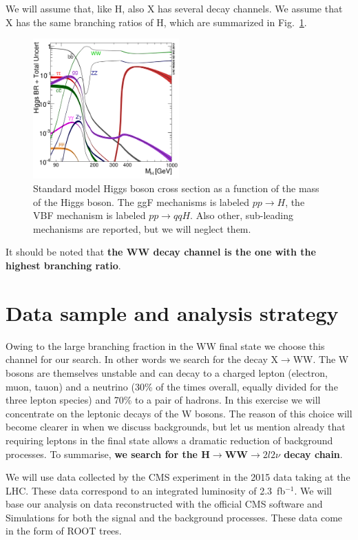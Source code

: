 \documentclass[a4paper,12pt]{article}
\begin{document}
 We will assume that, like H, also X has several decay channels. We assume
 that X has the same branching ratios of H, which are summarized in
 Fig.~\ref{fig:br}.  \begin{figure}
 \centering 
 \includegraphics[width=0.5\textwidth]{images/Higgs_BR.png}
 \caption{Standard model Higgs boson cross section as a function of the mass
 of the Higgs boson. The ggF mechanisms is labeled $pp\rightarrow{}H$, the VBF
 mechanism is labeled $pp\rightarrow{}qqH$. Also other, sub-leading mechanisms
 are reported, but we will neglect them.\label{fig:br}}
\end{figure}
It should be noted that {\bf the WW decay channel is the one with the highest
branching ratio}.

\section{Data sample and analysis strategy}
Owing to the large branching fraction in the WW final state we choose this
channel for our search. In other words we search for the decay
X$\rightarrow$WW. The W bosons are themselves unstable and can decay
to a charged lepton (electron, muon, tauon) and a neutrino (30\% of the times
overall, equally divided for the three lepton species) and 70\% to a pair of
hadrons. In this exercise we will concentrate on the leptonic decays of the W
bosons. The reason of this choice will become clearer in when we discuss
backgrounds, but let us mention already that requiring leptons in the final
state allows a dramatic reduction of background processes. 
To summarise, {\bf we search for the H$\rightarrow$WW$\rightarrow{}2l2\nu$ decay
chain}.

We will use data collected by the CMS experiment in the 2015 data taking at
the LHC. These data correspond to an integrated luminosity of 2.3~fb$^{-1}$.
We will base our analysis on data reconstructed with the official CMS software
and Simulations for both the signal and the background processes. These data
come in the form of ROOT trees.
\end{document}
